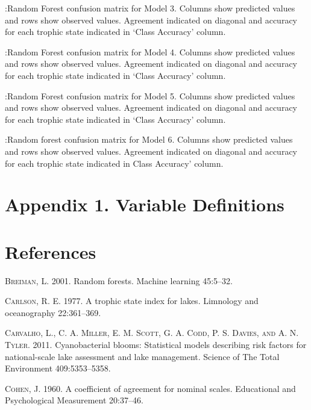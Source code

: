 \documentclass[11pt,]{article}
\begin{document}
\newpage

:Random Forest confusion matrix for Model 3. Columns show predicted
values and rows show observed values. Agreement indicated on diagonal
and accuracy for each trophic state indicated in `Class Accuracy'
column. \label{tab:Confusion_Model3}

\newpage

:Random Forest confusion matrix for Model 4. Columns show predicted
values and rows show observed values. Agreement indicated on diagonal
and accuracy for each trophic state indicated in `Class Accuracy'
column. \label{tab:Confusion_Model4}

\newpage

:Random Forest confusion matrix for Model 5. Columns show predicted
values and rows show observed values. Agreement indicated on diagonal
and accuracy for each trophic state indicated in `Class Accuracy'
column. \label{tab:Confusion_Model5}

\newpage

:Random forest confusion matrix for Model 6. Columns show predicted
values and rows show observed values. Agreement indicated on diagonal
and accuracy for each trophic state indicated in Class Accuracy' column.
\label{tab:Confusion_Model6}

\newpage

\section{Appendix 1. Variable
Definitions}\label{appendix-1.-variable-definitions}

\newpage

\section*{References}\label{references}

\textsc{Breiman, L.} 2001. Random forests. Machine learning 45:5--32.

\textsc{Carlson, R. E.} 1977. A trophic state index for lakes. Limnology
and oceanography 22:361--369.

\textsc{Carvalho, L., C. A. Miller, E. M. Scott, G. A. Codd, P. S.
Davies, and A. N. Tyler}. 2011. Cyanobacterial blooms: Statistical
models describing risk factors for national-scale lake assessment and
lake management. Science of The Total Environment 409:5353--5358.

\textsc{Cohen, J.} 1960. A coefficient of agreement for nominal scales.
Educational and Psychological Measurement 20:37--46.
\end{document}
